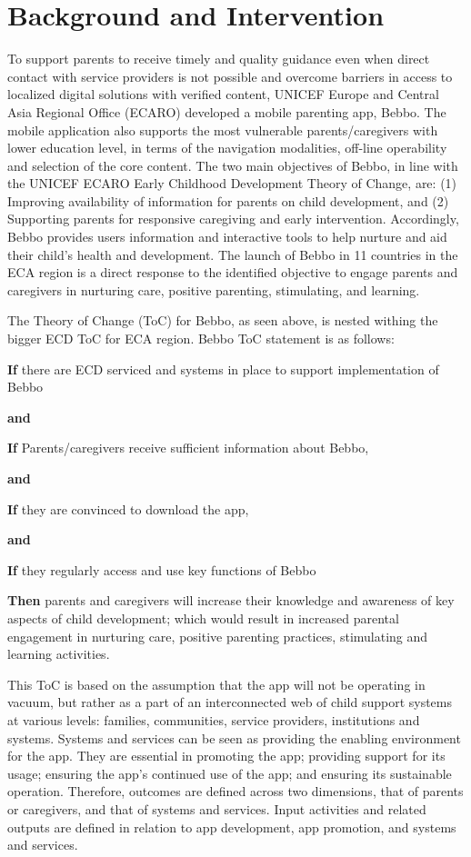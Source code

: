 \documentclass{article}
\begin{document}
\section{Background and Intervention}

To support parents to receive timely and quality guidance even when direct contact with service providers is not possible and overcome barriers in access to localized digital solutions with verified content, UNICEF Europe and Central Asia Regional Office (ECARO) developed a mobile parenting app, Bebbo. The mobile application also supports the most vulnerable parents/caregivers with lower education level, in terms of the navigation modalities, off-line operability and selection of the core content. The two main objectives of Bebbo, in line with the UNICEF ECARO Early Childhood Development Theory of Change, are: (1) Improving availability of information for parents on child development, and (2) Supporting parents for responsive caregiving and early intervention. Accordingly, Bebbo provides users information and interactive tools to help nurture and aid their child’s health and development. The launch of Bebbo in 11 countries in the ECA region is a direct response to the identified objective to engage parents and caregivers in nurturing care, positive parenting, stimulating, and learning.

The Theory of Change (ToC) for Bebbo, as seen above, is nested withing the bigger ECD ToC for ECA region. Bebbo ToC statement is as follows:

\textbf{If} there are ECD serviced and systems in place to support implementation of Bebbo

\textbf{and}

\textbf{If} Parents/caregivers receive sufficient information about Bebbo,

\textbf{and}

\textbf{If} they are convinced to download the app,

\textbf{and}

\textbf{If} they regularly access and use key functions of Bebbo

\textbf{Then} parents and caregivers will increase their knowledge and awareness of key aspects of child development; which would result in increased parental engagement in nurturing care, positive parenting practices, stimulating and learning activities.

This ToC is based on the assumption that the app will not be operating in vacuum, but rather as a part of an interconnected web of child support systems at various levels: families, communities, service providers, institutions and systems. Systems and services can be seen as providing the enabling environment for the app. They are essential in promoting the app; providing support for its usage; ensuring the app’s continued use of the app; and ensuring its sustainable operation. Therefore, outcomes are defined across two dimensions, that of parents or caregivers, and that of systems and services. Input activities and related outputs are defined in relation to app development, app promotion, and systems and services.
\end{document}
